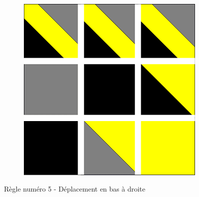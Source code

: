 \documentclass[a4paper]{article}
\begin{document}
\begin{figure}[!ht]
\begin{subfigure}[t]{0.17\textwidth}
    \end{subfigure}
    \hfill
    \begin{subfigure}[t]{0.17\textwidth}
        \includegraphics[width=\textwidth]{img/rule51.png}
    \end{subfigure}
    \caption{Règle numéro 5 - Déplacement en bas à droite}
\end{figure}
\end{document}
